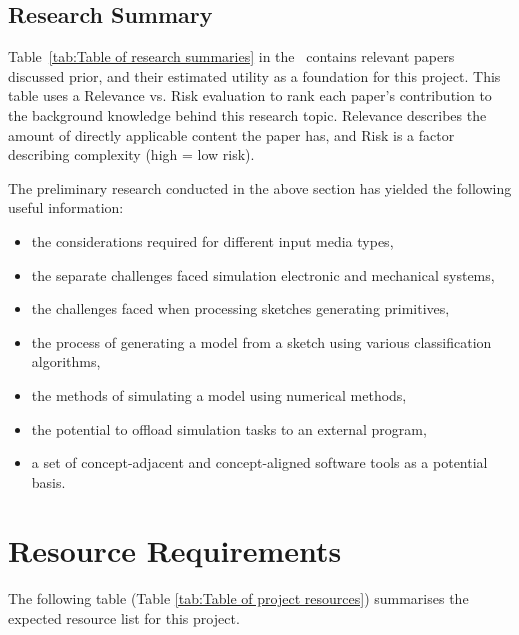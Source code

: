 \documentclass{article}
\begin{document}
\subsection{Research Summary}
\label{subsec:Research Summary}

Table~\ref{tab:Table of research summaries} in the \appendixname~contains relevant papers discussed prior, and their estimated utility as a foundation for this project.
This table uses a Relevance vs. Risk evaluation to rank each paper's contribution to the background knowledge behind this research
topic. Relevance describes the amount of directly applicable content the paper has, and Risk is a factor describing complexity
(high = low risk).

The preliminary research conducted in the above section has yielded the following useful information:

\begin{itemize}
  \item the considerations required for different input media types,
  \item the separate challenges faced simulation electronic and mechanical systems,
  \item the challenges faced when processing sketches generating primitives,
  \item the process of generating a model from a sketch using various classification algorithms,
  \item the methods of simulating a model using numerical methods,
  \item the potential to offload simulation tasks to an external program,
  \item a set of concept-adjacent and concept-aligned software tools as a potential basis.
\end{itemize}

\pagebreak
\section{Resource Requirements}
\label{subsec:Resource Requirements}

The following table (Table \ref{tab:Table of project resources}) summarises the expected resource list for this
project.
\end{document}
